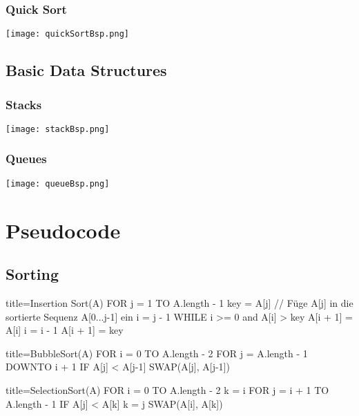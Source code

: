 \subsubsection*{Quick Sort}
\centerline{\texttt{[image: quickSortBsp.png]}}

\subsection*{Basic Data Structures}

\subsubsection*{Stacks}
\centerline{\texttt{[image: stackBsp.png]}}

\subsubsection*{Queues}
\centerline{\texttt{[image: queueBsp.png]}}

\section*{Pseudocode}
\subsection*{Sorting}
    \begin{ccode}[autogobble]{title=Insertion Sort(A)}  
        FOR j = 1 TO A.length - 1
          key = A[j]
          // Füge A[j] in die sortierte Sequenz A[0...j-1] ein
          i = j - 1
          WHILE i >= 0 and A[i] > key
              A[i + 1] = A[i]
              i = i - 1
          A[i + 1] = key
    \end{ccode}

    \begin{ccode}[autogobble]{title=BubbleSort(A)}  
        FOR i = 0 TO A.length - 2
            FOR j = A.length - 1 DOWNTO i + 1
                IF A[j] < A[j-1]
                    SWAP(A[j], A[j-1])
        \end{ccode}
    
        \begin{ccode}[autogobble]{title=SelectionSort(A)}
        FOR i = 0 TO A.length - 2
            k = i 
            FOR j = i + 1 TO A.length - 1
                IF A[j] < A[k]
                    k = j 
            SWAP(A[i], A[k])
        \end{ccode}
    
